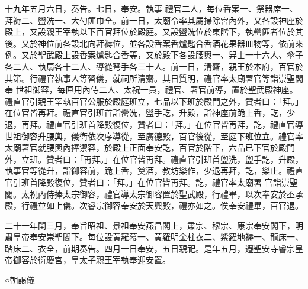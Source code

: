 \begin{pinyinscope}
 十九年五月六日，奏告。七日，奉安。執事
 禮官二人，每位香案一、祭器席一、拜褥二、盥洗一、大勺篚巾全。前一日，太廟令率其屬掃除宮內外，又各設神座於殿上，又設親王宰執以下百官拜位於殿庭。又設盥洗位於東階下，執罍篚者位於其後。又於神位前各設北向拜褥位，並各設香案香爐匙合香酒花果器皿物等，依前來例。又於聖武殿上設香案爐匙合香等，又於殿下各設腰輿一、舁士一十六人、傘子各二人、執扇各十二人、導從弩手各三十人。前一日，清齋，親王於本府，百官於其第。行禮官執事人等習儀，就祠所清齋。其日質明，禮官率太廟署官等詣崇聖閣奉
 世祖御容，每匣用內侍二人、太祝一員，禮官、署官前導，置於聖武殿神座。禮直官引親王宰執百官公服於殿庭班立，七品以下班於殿門之外，贊者曰：「拜。」在位官皆再拜。禮直官引班首詣罍洗，盥手訖，升殿，詣神座前跪上香，訖，少退，再拜。禮直官引班首降殿復位，贊者曰：「拜。」在位官皆再拜，訖，禮直官導
 世祖御容升腰輿，儀衛依次序導從，至廣德殿，百官後從，至庭下班位立。禮官率太廟署官就腰輿內捧禦容，於殿上正面奉安訖，百官於階下，六品已下官於殿門外，立班。贊者曰：「再拜。」在位官皆再拜。禮直官引班首盥洗，盥手訖，升殿，執事官等從升，詣御容前，跪上香，奠酒，教坊樂作，少退再拜，訖，樂止。禮直官引班首降殿復位，贊者曰：「拜。」在位官皆再拜。訖，禮官率太廟署
 官詣崇聖閣。太祝內侍捧太宗御容，禮官導太宗御容置於聖武殿，行禮畢，以次奉安於丕承殿，行禮並如上儀。次睿宗御容奉安於天興殿，禮亦如之。俟奉安禮畢，百官退。



 二十一年閏三月，奉旨昭祖、景祖奉安燕昌閣上，肅宗、穆宗、康宗奉安閣下，明肅皇帝奉安崇聖閣下。每位設黃羅幕一、黃羅明金柱衣二、紫羅地褥一、龍床一、踏床二、衣全，前期奏告。四月一日奉安，五日親祀。是年五月，遷聖安寺睿宗皇帝御容於衍慶宮，皇太子親王宰執奉迎安置。



 ○朝謁儀




\end{pinyinscope}

